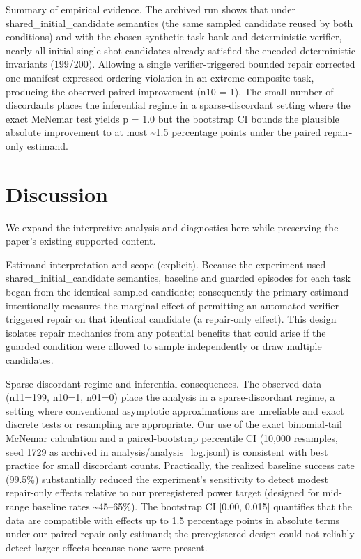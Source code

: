 \documentclass[conference]{IEEEtran}
\begin{document}
Summary of empirical evidence. The archived run shows that under shared\_initial\_candidate semantics (the same sampled candidate reused by both conditions) and with the chosen synthetic task bank and deterministic verifier, nearly all initial single-shot candidates already satisfied the encoded deterministic invariants (199/200). Allowing a single verifier-triggered bounded repair corrected one manifest-expressed ordering violation in an extreme composite task, producing the observed paired improvement (n10 = 1). The small number of discordants places the inferential regime in a sparse-discordant setting where the exact McNemar test yields p = 1.0 but the bootstrap CI bounds the plausible absolute improvement to at most \textasciitilde{}1.5 percentage points under the paired repair-only estimand.

\section{Discussion}
We expand the interpretive analysis and diagnostics here while preserving the paper's existing supported content.

Estimand interpretation and scope (explicit). Because the experiment used shared\_initial\_candidate semantics, baseline and guarded episodes for each task began from the identical sampled candidate; consequently the primary estimand intentionally measures the marginal effect of permitting an automated verifier-triggered repair on that identical candidate (a repair-only effect). This design isolates repair mechanics from any potential benefits that could arise if the guarded condition were allowed to sample independently or draw multiple candidates.

Sparse-discordant regime and inferential consequences. The observed data (n11=199, n10=1, n01=0) place the analysis in a sparse-discordant regime, a setting where conventional asymptotic approximations are unreliable and exact discrete tests or resampling are appropriate. Our use of the exact binomial-tail McNemar calculation and a paired-bootstrap percentile CI (10,000 resamples, seed 1729 as archived in analysis/analysis\_log.jsonl) is consistent with best practice for small discordant counts. Practically, the realized baseline success rate (99.5\%) substantially reduced the experiment's sensitivity to detect modest repair-only effects relative to our preregistered power target (designed for mid-range baseline rates \textasciitilde{}45--65\%). The bootstrap CI [0.00, 0.015] quantifies that the data are compatible with effects up to 1.5 percentage points in absolute terms under our paired repair-only estimand; the preregistered design could not reliably detect larger effects because none were present.
\end{document}
